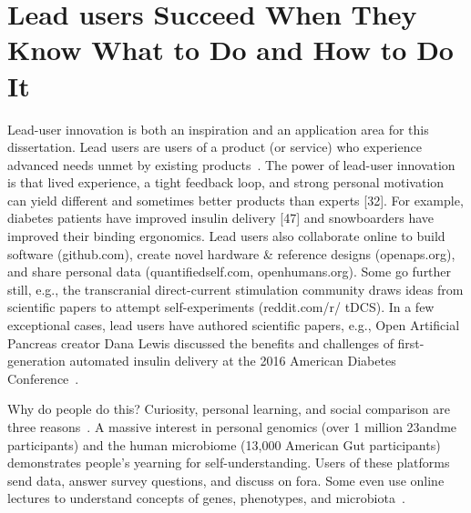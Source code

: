 \section{Lead users Succeed When They Know What to Do and How to Do It}


Lead-user innovation is both an inspiration and an application area for this dissertation. Lead users are
users of a product (or service) who experience advanced needs unmet by existing products~\cite{VonHippel2005}. The
power of lead-user innovation is that lived experience, a tight feedback loop, and strong personal
motivation can yield different and sometimes better products than experts [32]. For example, diabetes
patients have improved insulin delivery [47] and snowboarders have improved their binding
ergonomics. Lead users also collaborate online to build software
(github.com), create novel hardware \& reference designs
(openaps.org), and share personal data (quantifiedself.com,
openhumans.org). Some go further still, e.g., the transcranial
direct-current stimulation community draws ideas from scientific
papers to attempt self-experiments (reddit.com/r/
tDCS). In a few exceptional cases, lead users have authored
scientific papers, e.g., Open Artificial Pancreas creator
Dana Lewis discussed the benefits and challenges of first-generation
automated insulin delivery at the 2016 American
Diabetes Conference~\cite{DanaLewis}.

Why do people do this? Curiosity, personal learning, and social
comparison are three reasons~\cite{Reinecke2015}. A massive interest in
personal genomics (over 1 million 23andme participants)
and the human microbiome (13,000 American
Gut participants) demonstrates people’s yearning for self-understanding.
Users of these platforms send data, answer survey questions,
and discuss on fora. Some even use online lectures to understand
concepts of genes, phenotypes, and microbiota~\cite{23andMe2017, Knight2016}. 

